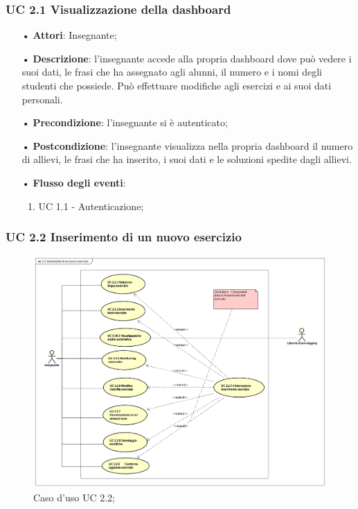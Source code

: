 \subsubsection{UC 2.1 Visualizzazione della dashboard}
\begin{itemize}
	\item[•] \textbf{Attori}: Insegnante;
	\item[•] \textbf{Descrizione}: l’insegnante accede alla propria dashboard dove può vedere i suoi dati, le frasi che ha assegnato agli alunni, il numero e i nomi degli studenti che possiede. Può effettuare modifiche agli esercizi e ai suoi dati personali.
	\item[•] \textbf{Precondizione}: l'insegnante si è autenticato;
	\item[•] \textbf{Postcondizione}: l'insegnante visualizza nella propria dashboard il numero di allievi, le frasi che ha inserito, i suoi dati e le soluzioni spedite dagli allievi.
	\item[•] \textbf{Flusso degli eventi}: 	
	\begin{enumerate}
		\item UC 1.1 - Autenticazione;
	\end{enumerate}

\end{itemize}

\subsubsection{UC 2.2 Inserimento di un nuovo esercizio}
\begin{figure}[H]
	\centering
	\includegraphics[width=17cm]{img/UC22.png} 
	\caption{Caso d'uso UC 2.2;}
\end{figure}


